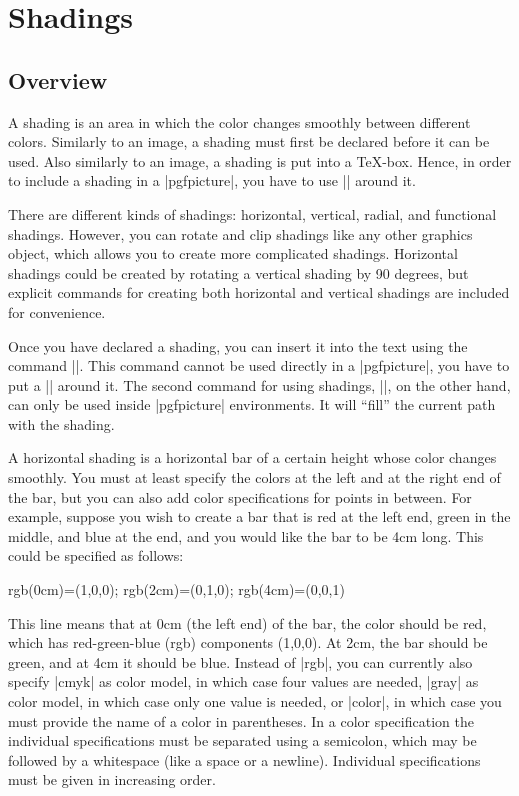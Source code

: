 %
%
%


\section{Shadings}
\label{section-shadings}

\subsection{Overview}

A shading is an area in which the color changes smoothly between different
colors. Similarly to an image, a shading must first be declared before it can
be used. Also similarly to an image, a shading is put into a \TeX-box. Hence,
in order to include a shading in a |{pgfpicture}|, you have to use |\pgftext|
around it.

There are different kinds of shadings: horizontal, vertical, radial, and
functional shadings. However, you can rotate and clip shadings like any other
graphics object, which allows you to create more complicated shadings.
Horizontal shadings could be created by rotating a vertical shading by 90
degrees, but explicit commands for creating both horizontal and vertical
shadings are included for convenience.

Once you have declared a shading, you can insert it into the text using the
command |\pgfuseshading|. This command cannot be used directly in a
|{pgfpicture}|, you have to put a |\pgftext| around it. The second command for
using shadings, |\pgfshadepath|, on the other hand, can only be used  inside
|{pgfpicture}| environments. It will ``fill'' the current path with the
shading.

A horizontal shading is a horizontal bar of a certain height whose color
changes smoothly. You must at least specify the colors at the left and at the
right end of the bar, but you can also add color specifications for points in
between. For example, suppose you wish to create a bar that is red at the left
end, green in the middle, and blue at the end, and you would like the bar to be
4cm long. This could be specified as follows:
%
\begin{codeexample}
rgb(0cm)=(1,0,0); rgb(2cm)=(0,1,0); rgb(4cm)=(0,0,1)
\end{codeexample}
%
This line means that at 0cm (the left end) of the bar, the color should be red,
which has red-green-blue (rgb) components (1,0,0). At 2cm, the bar should be
green, and at 4cm it should be blue. Instead of |rgb|, you can currently also
specify |cmyk| as color model, in which case four values are needed,
|gray| as color model, in which case only one value is needed, or
|color|, in which case you must provide the name of a color in parentheses. In
a color specification the individual specifications must be separated using a
semicolon, which may be followed by a whitespace (like a space or a newline).
Individual specifications must be given in increasing order.

